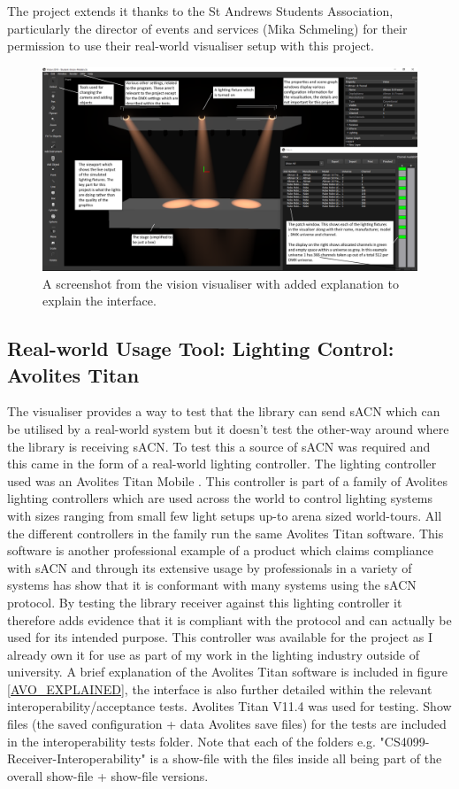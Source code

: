 \documentclass[11pt,a4paper]{article}
\begin{document}
The project extends it thanks to the St Andrews Students Association, particularly the director of events and services (Mika Schmeling) for their permission to use their real-world visualiser setup with this project.

\begin{figure}[H]
	\includegraphics[width=\textwidth]{vision_explained}
	\caption{A screenshot from the vision visualiser with added explanation to explain the interface.}
	\label{VISION_EXPLAINED}
\end{figure}

\subsection{Real-world Usage Tool: Lighting Control: Avolites Titan}
The visualiser provides a way to test that the library can send sACN which can be utilised by a real-world system but it doesn't test the other-way around where the library is receiving sACN. To test this a source of sACN was required and this came in the form of a real-world lighting controller. The lighting controller used was an Avolites Titan Mobile \cite{AVO_TITAN_MOBILE}. This controller is part of a family of Avolites lighting controllers which are used across the world to control lighting systems with sizes ranging from small few light setups up-to arena sized world-tours. All the different controllers in the family run the same Avolites Titan software. This software is another professional example of a product which claims compliance with sACN and through its extensive usage by professionals in a variety of systems has show that it is conformant with many systems using the sACN protocol. By testing the library receiver against this lighting controller it therefore adds evidence that it is compliant with the protocol and can actually be used for its intended purpose. This controller was available for the project as I already own it for use as part of my work in the lighting industry outside of university. A brief explanation of the Avolites Titan software is included in figure \ref{AVO_EXPLAINED}, the interface is also further detailed within the relevant interoperability/acceptance tests. Avolites Titan V11.4 was used for testing. Show files (the saved configuration + data Avolites save files) for the tests are included in the interoperability tests folder. Note that each of the folders e.g. "CS4099-Receiver-Interoperability" is a show-file with the files inside all being part of the overall show-file + show-file versions.
\end{document}
